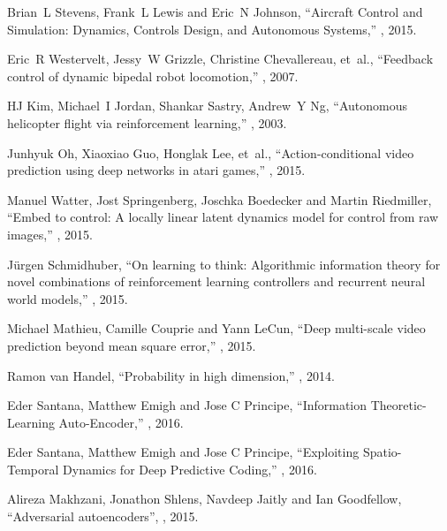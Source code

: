 \documentclass{article} %
\begin{document}
\begin{thebibliography}{10}
Brian~L Stevens, Frank~L Lewis and Eric~N Johnson,
\newblock ``Aircraft Control and Simulation: Dynamics, Controls Design, and Autonomous Systems,''
, 2015.

Eric~R Westervelt, Jessy~W Grizzle, Christine Chevallereau, et~al.,
\newblock ``Feedback control of dynamic bipedal robot locomotion,''
, 2007.

HJ Kim, Michael~I Jordan, Shankar Sastry, Andrew~Y Ng,
\newblock ``Autonomous helicopter flight via reinforcement learning,''
, 2003.

Junhyuk Oh, Xiaoxiao Guo, Honglak Lee, et~al.,
\newblock ``Action-conditional video prediction using deep networks in atari games,''
, 2015.

Manuel Watter, Jost Springenberg, Joschka Boedecker and Martin Riedmiller,
\newblock ``Embed to control: A locally linear latent dynamics model for control from raw images,''
, 2015.

J{\"u}rgen Schmidhuber,
\newblock ``On learning to think: Algorithmic information theory for novel combinations of reinforcement learning controllers and recurrent neural world models,''
, 2015.

Michael Mathieu, Camille Couprie and Yann LeCun,
\newblock ``Deep multi-scale video prediction beyond mean square error,''
, 2015.

Ramon van Handel,
\newblock ``Probability in high dimension,''
, 2014.

Eder Santana, Matthew Emigh and Jose C Principe,
\newblock ``Information Theoretic-Learning Auto-Encoder,''
, 2016.

Eder Santana, Matthew Emigh and Jose C Principe,
\newblock ``Exploiting Spatio-Temporal Dynamics for Deep Predictive Coding,''
, 2016.

Alireza Makhzani, Jonathon Shlens, Navdeep Jaitly and Ian Goodfellow,
\newblock ``Adversarial autoencoders'',
, 2015.


\end{thebibliography}
\end{document}

